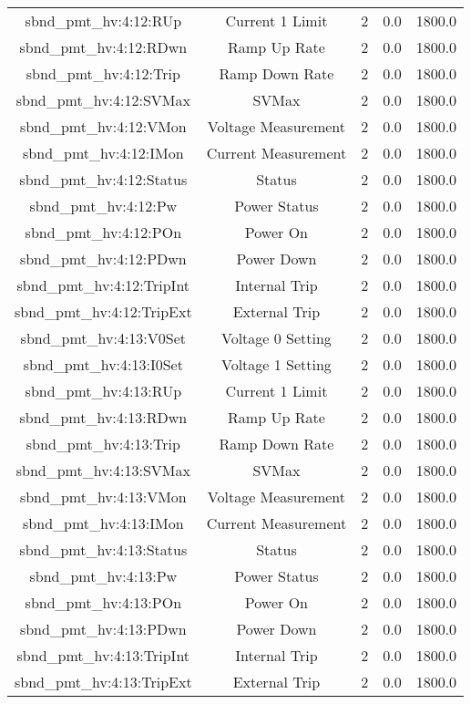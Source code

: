 \begin{center}
\begin{longtable}{c | c c c c }
sbnd\_pmt\_hv:4:12:RUp & Current 1 Limit & 2 & 0.0 & 1800.0\\ 
sbnd\_pmt\_hv:4:12:RDwn & Ramp Up Rate & 2 & 0.0 & 1800.0\\ 
sbnd\_pmt\_hv:4:12:Trip & Ramp Down Rate & 2 & 0.0 & 1800.0\\ 
sbnd\_pmt\_hv:4:12:SVMax & SVMax & 2 & 0.0 & 1800.0\\ 
sbnd\_pmt\_hv:4:12:VMon & Voltage Measurement & 2 & 0.0 & 1800.0\\ 
sbnd\_pmt\_hv:4:12:IMon & Current Measurement & 2 & 0.0 & 1800.0\\ 
sbnd\_pmt\_hv:4:12:Status & Status & 2 & 0.0 & 1800.0\\ 
sbnd\_pmt\_hv:4:12:Pw & Power Status & 2 & 0.0 & 1800.0\\ 
sbnd\_pmt\_hv:4:12:POn & Power On & 2 & 0.0 & 1800.0\\ 
sbnd\_pmt\_hv:4:12:PDwn & Power Down & 2 & 0.0 & 1800.0\\ 
sbnd\_pmt\_hv:4:12:TripInt & Internal Trip & 2 & 0.0 & 1800.0\\ 
sbnd\_pmt\_hv:4:12:TripExt & External Trip & 2 & 0.0 & 1800.0\\ 
sbnd\_pmt\_hv:4:13:V0Set & Voltage 0 Setting & 2 & 0.0 & 1800.0\\ 
sbnd\_pmt\_hv:4:13:I0Set & Voltage 1 Setting & 2 & 0.0 & 1800.0\\ 
sbnd\_pmt\_hv:4:13:RUp & Current 1 Limit & 2 & 0.0 & 1800.0\\ 
sbnd\_pmt\_hv:4:13:RDwn & Ramp Up Rate & 2 & 0.0 & 1800.0\\ 
sbnd\_pmt\_hv:4:13:Trip & Ramp Down Rate & 2 & 0.0 & 1800.0\\ 
sbnd\_pmt\_hv:4:13:SVMax & SVMax & 2 & 0.0 & 1800.0\\ 
sbnd\_pmt\_hv:4:13:VMon & Voltage Measurement & 2 & 0.0 & 1800.0\\ 
sbnd\_pmt\_hv:4:13:IMon & Current Measurement & 2 & 0.0 & 1800.0\\ 
sbnd\_pmt\_hv:4:13:Status & Status & 2 & 0.0 & 1800.0\\ 
sbnd\_pmt\_hv:4:13:Pw & Power Status & 2 & 0.0 & 1800.0\\ 
sbnd\_pmt\_hv:4:13:POn & Power On & 2 & 0.0 & 1800.0\\ 
sbnd\_pmt\_hv:4:13:PDwn & Power Down & 2 & 0.0 & 1800.0\\ 
sbnd\_pmt\_hv:4:13:TripInt & Internal Trip & 2 & 0.0 & 1800.0\\ 
sbnd\_pmt\_hv:4:13:TripExt & External Trip & 2 & 0.0 & 1800.0\\ 

\end{longtable}
\end{center}
